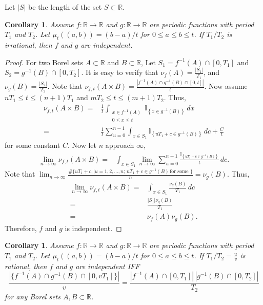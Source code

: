 \documentclass[english]{article} %
\newcommand{\todor}[2][]{\todo[color=Blue!10,#1]{#2}}
\newcommand{\ind}[1]{\mathbb{I}_{\left\{ #1 \right\}}}
\newcommand{\real}{\mathbb{R}}
\providecommand{\corollaryname}{Corollary}
\theoremstyle{plain}
\newtheorem{cor}[thm]{\protect\corollaryname}
\theoremstyle{definition}
\theoremstyle{remark}
\begin{document}
Let $|S|$ be the length of the set $S\subset \real$. 
\begin{cor}
Assume $f:\real\rightarrow\real$ and $g:\real\rightarrow\real$ are periodic functions with period $T_1$ and $T_2$. 
Let $\mu_t((a,b)) = (b-a)/t$ for $0\le a\le b\le t$. If $T_1/T_2$ is irrational, then $f$ and $g$ are independent. 
\end{cor}
\begin{proof}
 For two Borel sets $A\subset \real$ and $B\subset \real$, Let $S_1 =f^{-1}(A)\cap [0,T_1] $ and $ S_2 = g^{-1}(B)\cap [0,T_2]$. It is easy to verify that $\nu_f(A) = \frac{|S_1|}{T_1}$, and $\nu_g(B) = \frac{|S_2|}{T_2}$. 
 Note that $\nu_{f,t}(A\times B) = \frac{|f^{-1}(A)\cap g^{-1}(B)\cap [0,t] |}{t}$. Now assume $nT_1 \le t\le (n+1)T_1$ and $mT_2\le t \le (m+1)T_2$. Thus,
 \begin{align*}
 \nu_{f,t}(A\times B) = & \frac{1}{t} \int_{ \substack{x\in f^{-1}(A) \\ 0\le x \le t}} \ind{x\in g^{-1}(B)}\, dx \\
 					=	& \frac{1}{t} \sum_{u=0}^{n-1} \int_{x\in S_1} \ind{uT_1+c \in g^{-1}(B)}\, dc + \frac{C}{t}
 \end{align*}
 for some constant $C$. Now let $n$ approach $\infty$,
 \begin{align*}
  \lim\limits_{n\rightarrow \infty} \nu_{f,t}(A\times B) = & \int_{x\in S_1} \lim\limits_{n\rightarrow \infty} \sum_{u=0}^{n-1} \frac{\ind{uT_1+c \in g^{-1}(B)}}{t} \, dc.
 \end{align*}
 Note that $\lim_{n\rightarrow \infty}\frac{\#\{uT_1+c, \vert u = 1,2,\ldots, n; \, nT_1+c \in g^{-1}(B)\, \text{for some }\}}{n} = \nu_{g}(B)$. 
 \todor{how to prove it?} Thus, 
 \begin{align*}
 \lim\limits_{n\rightarrow \infty} \nu_{f,t}(A\times B) = & \int_{x\in S_1} \frac{\nu_g(B)}{T_1}\, dc \\
 														= & \frac{|S_1|\nu_g(B)}{T_1} \\
 														= & \nu_f(A)\nu_g(B).
 \end{align*}
 Therefore, $f$ and $g$ is independent.
\end{proof}

\begin{cor}
Assume $f:\real\rightarrow\real$ and $g:\real\rightarrow\real$ are periodic functions with period $T_1$ and $T_2$. 
Let $\mu_t((a,b)) = (b-a)/t$ for $0\le a\le b\le t$.  
If $T_1/T_2 = \frac{u}{v}$ is rational, then $f$ and $g$ are independent IFF 
\[
\frac{|\{f^{-1}(A)\cap g^{-1}(B) \cap [0,vT_1]\}|}{v} = \frac{|f^{-1}(A)\cap [0,T_1]| \,|g^{-1}(B)\cap [0,T_2]|}{T_2}
\]
for any Borel sets $A,B\subset \real$.
\end{cor}
\end{document}
